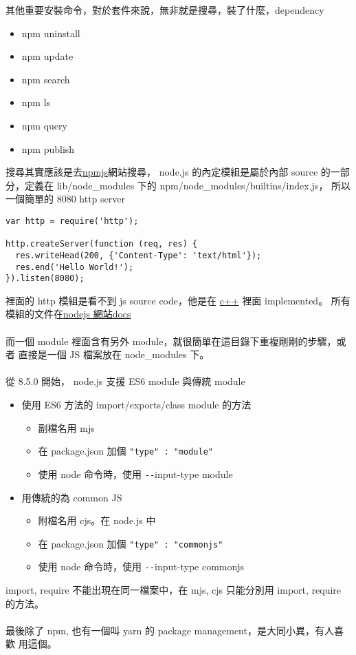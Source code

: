   其他重要安裝命令，對於套件來說，無非就是搜尋，裝了什麼，dependency
  \begin{itemize}
    \item npm uninstall
    \item npm update
    \item npm search
    \item npm ls
    \item npm query
    \item npm publish
  \end{itemize}
  搜尋其實應該是去\href{https://www.npmjs.com/}{npmjs}網站搜尋，
  node.js 的內定模組是屬於內部 source 的一部分，定義在 lib/node\_modules 下的
  npm/node\_modules/builtins/index.js， 所以一個簡單的 8080 http server
  \begin{verbatim}
var http = require('http');

http.createServer(function (req, res) {
  res.writeHead(200, {'Content-Type': 'text/html'});
  res.end('Hello World!');
}).listen(8080);
  \end{verbatim}
  裡面的 http 模組是看不到 js source code，他是在
  \href{https://github.com/nodejs/node/tree/main/src}{c++} 裡面 implemented。
  所有模組的文件在\href{https://nodejs.org/docs/latest/api/}{nodejs 網站docs}
  \\\\
  而一個 module 裡面含有另外 module，就很簡單在這目錄下重複剛剛的步驟，或者
  直接是一個 JS 檔案放在 node\_modules 下。
  \\\\
  從 8.5.0 開始， node.js 支援 ES6 module 與傳統 module
  \begin{itemize}
    \item 使用 ES6 方法的 import/exports/class module 的方法 
      \begin{itemize}
        \item 副檔名用 mjs
        \item 在 package.json 加個 \verb="type" : "module"=
        \item 使用 node 命令時，使用 \verb=--=input-type module
      \end{itemize}
    \item 用傳統的為 common JS
      \begin{itemize}
        \item 附檔名用 cjs。在 node.js 中
        \item 在 package.json 加個 \verb="type" : "commonjs"=
        \item 使用 node 命令時，使用 \verb=--=input-type commonjs
      \end{itemize}
  \end{itemize}
  import, require 不能出現在同一檔案中，在 mjs, cjs 只能分別用 import, require
  的方法。
  \\\\
  最後除了 npm, 也有一個叫 yarn 的 package management，是大同小異，有人喜歡
  用這個。

